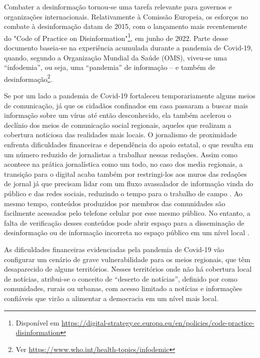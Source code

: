 \documentclass[portuguese]{textolivre}
\begin{document}
Combater a desinformação tornou-se uma tarefa relevante para governos e organizações internacionais. Relativamente à Comissão Europeia, os esforços no combate à desinformação datam de 2015, com o lançamento mais recentemente do "Code of Practice on Disinformation"\footnote{Disponível em \url{https://digital-strategy.ec.europa.eu/en/policies/code-practice-disinformation}}, em junho de 2022. Parte desse documento baseia-se na experiência acumulada durante a pandemia de Covid-19, quando, segundo a Organização Mundial da Saúde (OMS), viveu-se uma “infodemia”, ou seja, uma “pandemia” de informação – e também de desinformação\footnote{Ver \url{https://www.who.int/health-topics/infodemic}}.

Se por um lado a pandemia de Covid-19 fortaleceu temporariamente alguns meios de comunicação, já que os cidadãos confinados em casa passaram a buscar mais informação sobre um vírus até então desconhecido, ela também acelerou o declínio dos meios de comunicação social regionais, aqueles que realizam a cobertura noticiosa das realidades mais locais. O jornalismo de proximidade enfrenta dificuldades financeiras e dependência do apoio estatal, o que resulta em um número reduzido de jornalistas a trabalhar nessas redações. Assim como acontece na prática jornalística como um todo, no caso dos media regionais, a transição para o digital acaba também por restringi-los aos muros das redações de jornal já que precisam lidar com um fluxo avassalador de informação vinda do público e das redes sociais, reduzindo o tempo para o trabalho de campo \cite{jeronimocorreia_are_2022}. Ao mesmo tempo, conteúdos produzidos por membros das comunidades são facilmente acessados pelo telefone celular por esse mesmo público. No entanto, a falta de verificação desses conteúdos pode abrir espaço para a disseminação de desinformação ou de informação incorreta no espaço público em um nível local \cite{jeronimoespartaza022}.

As dificuldades financeiras evidenciadas pela pandemia de Covid-19 vão configurar um cenário de grave vulnerabilidade para os meios regionais, que têm desaparecido de alguns territórios. Nesses territórios onde não há cobertura local de notícias, atribui-se o conceito de “deserto de notícias”, definido por \textcite{abernathy_expanding_2018} como comunidades, rurais ou urbanas, com acesso limitado a notícias e informações confiáveis que virão a alimentar a democracia em um nível mais local.
\end{document}
